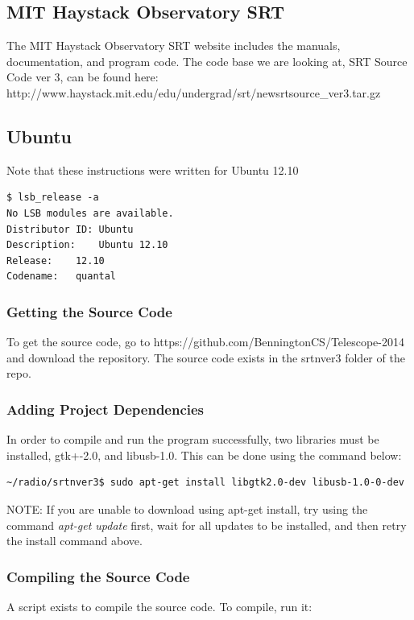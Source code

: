 \documentclass[11pt]{article} %
\begin{document}
\subsection{MIT Haystack Observatory SRT}
The MIT Haystack Observatory SRT website includes the manuals, documentation, and program code. The code base we are looking at, SRT Source Code ver 3, can be found here: \\ http://www.haystack.mit.edu/edu/undergrad/srt/newsrtsource\_ver3.tar.gz


\subsection{Ubuntu}

Note that these instructions were written for Ubuntu 12.10

\begin{verbatim}
$ lsb_release -a
No LSB modules are available.
Distributor ID: Ubuntu
Description:    Ubuntu 12.10
Release:    12.10
Codename:   quantal
\end{verbatim}



\subsubsection{Getting the Source Code}
To get the source code, go to https://github.com/BenningtonCS/Telescope-2014 and download the repository. The source code exists in the srtnver3 folder of the repo.


\subsubsection{Adding Project Dependencies}
 In order to compile and run the program successfully, two libraries must be installed, gtk+-2.0, and libusb-1.0. This can be done using the command below:

\begin{verbatim}
~/radio/srtnver3$ sudo apt-get install libgtk2.0-dev libusb-1.0-0-dev
\end{verbatim}

NOTE: If you are unable to download using apt-get install, try using the command \emph{apt-get update} first, wait for all updates to be installed, and then retry the install command above.


\subsubsection{Compiling the Source Code}
A script exists to compile the source code. To compile, run it:
\end{document}
